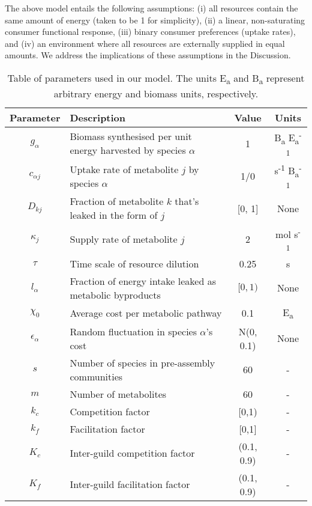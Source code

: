 \documentclass[10pt,letterpaper]{article}
\begin{document}
The above model entails the following assumptions: (i) all resources contain the same amount of energy (taken to be 1 for simplicity), (ii) a linear, non-saturating consumer functional response, (iii) binary consumer preferences (uptake rates), and (iv) an environment where all resources are externally supplied in equal amounts. We address the implications of these assumptions in the Discussion.

\begin{table}[ht]
\begin{adjustwidth}{-0.9in}{0in}
\centering
\begin{tabular}[t]{| c | l | c | c |}
    \hline
    \bf Parameter & \bf  Description & \bf Value & \bf Units \\ \hline
    $g_\alpha$ & Biomass synthesised per unit energy harvested by species $\alpha$ & 1 & B\textsubscript{a} E\textsubscript{a}\textsuperscript{-1} \\ \hline
    $c_{\alpha j}$ & Uptake rate of metabolite $j$ by species $\alpha$ & 1/0 & s\textsuperscript{-1} B\textsubscript{a}\textsuperscript{-1} \\ \hline
    $D_{kj}$ & Fraction of metabolite $k$ that's leaked in the form of $j$ & [0, 1]& None \\ \hline
    $\kappa_j$ & Supply rate of metabolite $j$ & 2 & mol s\textsuperscript{-1} \\ \hline
    $\tau$ & Time scale of resource dilution & 0.25 & s \\ \hline
    $l_\alpha$ & Fraction of energy intake leaked as metabolic byproducts & $[0,1)$ & None \\ \hline
    $\chi_0$ & Average cost per metabolic pathway & 0.1 & E\textsubscript{a} \\ \hline
    $\epsilon_\alpha$ & Random fluctuation in species $\alpha$'s cost & N(0, 0.1) & None \\ \hline
    $s$ & Number of species in pre-assembly communities & 60 & - \\ \hline
    $m$ & Number of metabolites & 60  & - \\ \hline
    $k_c$ & Competition factor & [0,1) & - \\ \hline
    $k_f$ & Facilitation factor & [0,1] & - \\ \hline
    $K_c$ & Inter-guild competition factor & (0.1, 0.9) & - \\ \hline
    $K_f$ & Inter-guild facilitation factor & (0.1, 0.9) & - \\ \hline
\end{tabular}
\caption{Table of parameters used in our model. The units E\textsubscript{a} and B\textsubscript{a} represent arbitrary energy and biomass units, respectively.}
\label{tab:params}
\end{adjustwidth}
\end{table}
\end{document}
